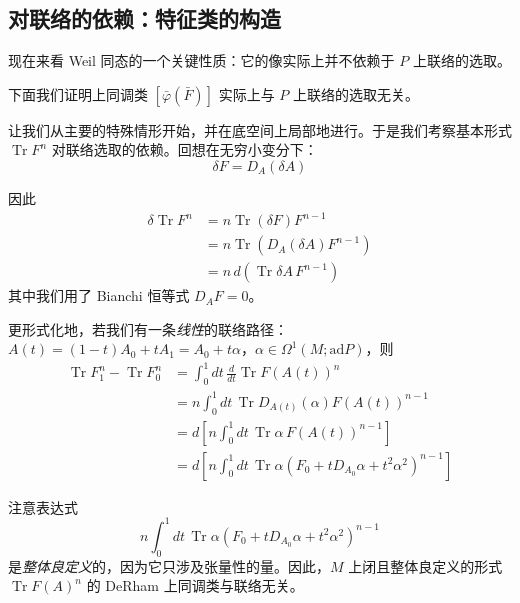 \subsection{对联络的依赖：特征类的构造} %

现在来看 Weil 同态的一个关键性质：它的像实际上并不依赖于 $P$ 上联络的选取。

下面我们证明上同调类 $[\bar\varphi(\bar F)]$ 实际上与 $P$ 上联络的选取无关。

让我们从主要的特殊情形开始，并在底空间上局部地进行。于是我们考察基本形式 $\operatorname{Tr}F^n$ 对联络选取的依赖。回想在无穷小变分下：
\begin{equation}
  \delta F = D_A(\delta A)
  \tag{I.18}
  \label{eq:I.18}
\end{equation}

因此
\begin{equation}
\begin{aligned}
  \delta\operatorname{Tr}F^n
  &= n\operatorname{Tr}(\delta F)F^{n-1}\\
  &= n\operatorname{Tr}\left(D_A(\delta A)F^{n-1}\right)\\
  &= n\,d\left(\operatorname{Tr}\delta A\,F^{n-1}\right)
\end{aligned}
  \tag{I.19}
  \label{eq:I.19}
\end{equation}
其中我们用了 Bianchi 恒等式 $D_AF=0$。

更形式化地，若我们有一条\emph{线性}的联络路径：$A(t)=(1-t)A_0+tA_1=A_0+t\alpha$，$\alpha\in\Omega^1(M;\mathrm{ad}P)$，则
\begin{equation}
\begin{aligned}
  \operatorname{Tr}F_1^n-\operatorname{Tr}F_0^n
  &= \int_0^1 dt\,\frac{d}{dt}\operatorname{Tr}F(A(t))^n\\
  &= n\int_0^1 dt\,\operatorname{Tr}D_{A(t)}(\alpha)F(A(t))^{n-1}\\
  &= d\left[n\int_0^1 dt\,\operatorname{Tr}\alpha\,F(A(t))^{n-1}\right]\\
  &= d\left[n\int_0^1 dt\,\operatorname{Tr}\alpha\left(F_0+tD_{A_0}\alpha+t^2\alpha^2\right)^{n-1}\right]
\end{aligned}
  \tag{I.20}
  \label{eq:I.20}
\end{equation}

注意表达式
\begin{equation}
  n\int_0^1 dt\,\operatorname{Tr}\alpha\left(F_0+tD_{A_0}\alpha+t^2\alpha^2\right)^{n-1}
  \tag{I.21}
  \label{eq:I.21}
\end{equation}
是\emph{整体良定义}的，因为它只涉及张量性的量。因此，$M$ 上闭且整体良定义的形式 $\operatorname{Tr}F(A)^n$ 的 DeRham 上同调类与联络无关。

